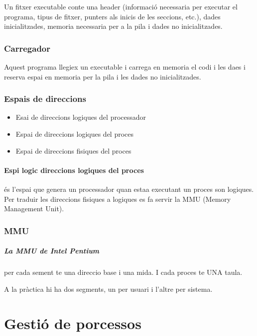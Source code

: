\documentclass{article}
\begin{document}
        Un fitxer executable conte una header (informació necessaria per executar el programa, tipus de fitxer, punters als inicis de les seccions, etc.), dades inicialitzades, memoria necessaria per a la pila i dades no inicialitzades.
        
        \subsubsection{Carregador}

            Aquest programa llegiex un executable i carrega en memoria el codi i les daes i reserva espai en memoria per la pila i les dades no inicialitzades.

        \subsubsection{Espais de direccions}

            \begin{itemize}
                \item Esai de direccions logiques del processador
                \item Espai de direccions logiques del proces
                \item Espai de direccions fisiques del proces
            \end{itemize}
            
        \paragraph{Espi logic direccions logiques del proces}
        és l'espai que genera un processador quan estaa executant un proces son logiques. Per traduir les direccions fisiques a logiques es fa servir la MMU (Memory Management Unit).

        \subsubsection{MMU}

        \subparagraph{La MMU de Intel Pentium}
        per cada sement te una direccio base i una mida. I cada proces te UNA taula.
        
        A la pràctica hi ha dos segments, un per usuari i l'altre per sistema.

    \pagebreak

    \section{Gestió de porcessos}
\end{document}
